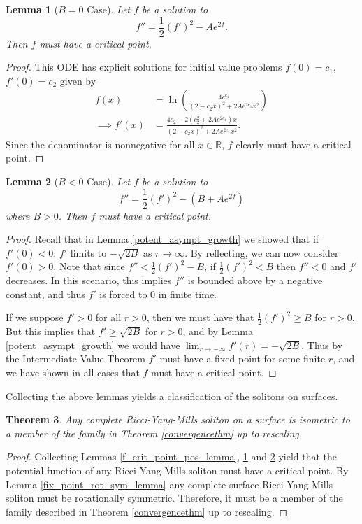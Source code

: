\documentclass[12pt, a4paper, reqno, oneside]{amsart}
\newcommand{\R}{\mathbb{R}}
\numberwithin{equation}{section}
\theoremstyle{plain}
\newtheorem{theorem}{Theorem}[section]
\newtheorem{lemma}[theorem]{Lemma}
\theoremstyle{definition}
\theoremstyle{plain}
\begin{document}
\begin{lemma}[$B=0$ Case]\label{f_crit_point_zero_lemma}
  Let $f$ be a solution to
  \[
    f'' = \frac{1}{2}(f')^{2}-Ae^{2f}.
  \]
  Then $f$ must have a critical point.
\end{lemma}
\begin{proof}
  This ODE has explicit solutions for initial value problems $f(0)=c_1$, $f'(0)=c_2$ given by
  \begin{align*}
    f(x) &= \ln\left(\frac{4e^{c_{1}}}{(2-c_{2}x)^{2}+2Ae^{2c_{1}}x^{2}}\right)\\
    \implies f'(x) &= \frac{4c_{2}-2(c_{2}^{2}+2Ae^{2c_{1}})x}{(2-c_{2}x)^{2}+2Ae^{2c_{1}}x^{2}}.
  \end{align*}
  Since the denominator is nonnegative for all $x\in\R$, $f$ clearly must have a critical point.
\end{proof}

\begin{lemma}[$B<0$ Case]\label{f_crit_point_neg_lemma}
  Let $f$ be a solution to
  \[
    f'' = \frac{1}{2}(f')^{2}-(B+Ae^{2f})
  \]
  where $B>0$. Then $f$ must have a critical point.
\end{lemma}
\begin{proof}
  Recall that in Lemma \ref{potent_asympt_growth} we showed that if $f'(0)<0$, $f'$ limits to $-\sqrt{2B}$ as $r\to\infty$. By reflecting, we can now consider $f'(0)>0$. Note that since $f''<\tfrac{1}{2}(f')^{2}-B$, if $\tfrac{1}{2}(f')^{2}<B$ then $f''<0$ and $f'$ decreases. In this scenario, this implies $f''$ is bounded above by a negative constant, and thus $f'$ is forced to 0 in finite time. 

  If we suppose $f'>0$ for all $r>0$, then we must have that $\tfrac{1}{2}(f')^2\geq B$ for $r>0$. But this implies that $f'\geq \sqrt{2B}$ for $r>0$, and by Lemma \ref{potent_asympt_growth} we would have $\lim_{r\to-\infty}f'(r)=-\sqrt{2B}$. Thus by the Intermediate Value Theorem $f'$ must have a fixed point for some finite $r$, and we have shown in all cases that $f$ must have a critical point.
\end{proof}

Collecting the above lemmas yields a classification of the solitons on surfaces.
\begin{theorem}\label{classification_thm}
  Any complete Ricci-Yang-Mills soliton on a surface is isometric to a member of the family in Theorem \ref{convergencethm} up to rescaling.
\end{theorem}
\begin{proof}
  Collecting Lemmas \ref{f_crit_point_pos_lemma}, \ref{f_crit_point_zero_lemma} and \ref{f_crit_point_neg_lemma} yield that the potential function of any Ricci-Yang-Mills soliton must have a critical point. By Lemma \ref{fix_point_rot_sym_lemma} any complete surface Ricci-Yang-Mills soliton must be rotationally symmetric. Therefore, it must be a member of the family described in Theorem \ref{convergencethm} up to rescaling.
\end{proof}

\printbibliography
\end{document}
